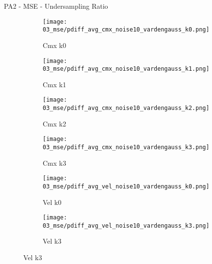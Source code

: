 \documentclass{beamer}
\begin{document}
\begin{frame}{PA2 - MSE - Undersampling Ratio}{}
\begin{figure}
\begin{subfigure}{0.24\textwidth}
\texttt{[image: 03\_mse/pdiff\_avg\_cmx\_noise10\_vardengauss\_k0.png]}
\vspace{-20pt}
\caption*{\tiny Cmx k0}
\end{subfigure}
\begin{subfigure}{0.24\textwidth}
\texttt{[image: 03\_mse/pdiff\_avg\_cmx\_noise10\_vardengauss\_k1.png]}
\vspace{-20pt}
\caption*{\tiny Cmx k1}
\end{subfigure}
\begin{subfigure}{0.24\textwidth}
\texttt{[image: 03\_mse/pdiff\_avg\_cmx\_noise10\_vardengauss\_k2.png]}
\vspace{-20pt}
\caption*{\tiny Cmx k2}
\end{subfigure}
\begin{subfigure}{0.24\textwidth}
\texttt{[image: 03\_mse/pdiff\_avg\_cmx\_noise10\_vardengauss\_k3.png]}
\vspace{-20pt}
\caption*{\tiny Cmx k3}
\end{subfigure}

\begin{subfigure}{0.49\textwidth}
\texttt{[image: 03\_mse/pdiff\_avg\_vel\_noise10\_vardengauss\_k0.png]}
\vspace{-20pt}
\caption*{\tiny Vel k0}
\end{subfigure}
\begin{subfigure}{0.49\textwidth}
\texttt{[image: 03\_mse/pdiff\_avg\_vel\_noise10\_vardengauss\_k3.png]}
\vspace{-20pt}
\caption*{\tiny Vel k3}
\end{subfigure}
\end{figure}
\end{frame}
\end{document}
